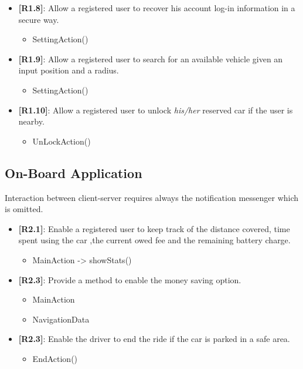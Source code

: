 \begin{itemize}
	\item{\textbf{[R1.8]}}: Allow a registered user to recover his account log-in information in a secure way.
	\begin{itemize}
	\item SettingAction()
	\end{itemize}
	\item{\textbf{[R1.9]}}: Allow a registered user to search for an available vehicle given an input position and a radius.
	\begin{itemize}
	\item SettingAction()
	\end{itemize}
	\item{\textbf{[R1.10]}}: Allow a registered user to unlock \emph{his/her} reserved car if the user is nearby.
	\begin{itemize}
	\item UnLockAction()
	\end{itemize}
\end{itemize}

\subsection{On-Board Application}
Interaction between client-server requires always the notification messenger which is omitted.\\
\begin{itemize}
	\item{\textbf{[R2.1]}}: Enable a registered user to keep track of the distance covered, time spent using the car ,the current owed fee and the remaining battery charge.
	\begin{itemize}
	\item MainAction -> showStats()
	\end{itemize}
	\item{\textbf{[R2.3]}}: Provide a method to enable the money saving option.
	\begin{itemize}
	\item MainAction
	\item NavigationData
	\end{itemize}
	\item{\textbf{[R2.3]}}: Enable the driver to end the ride if the car is parked in a safe area.
	\begin{itemize}
	\item EndAction()
	\end{itemize}
 \end{itemize}

